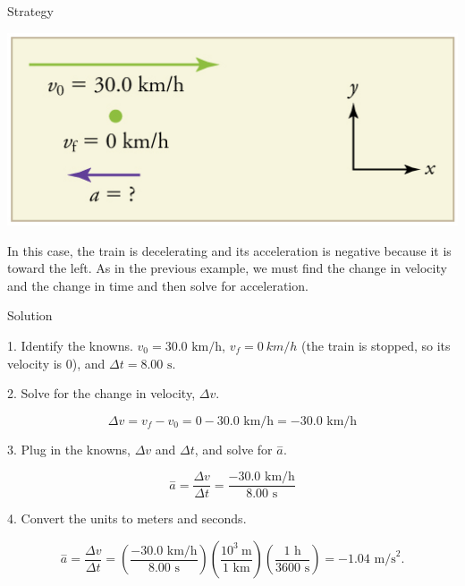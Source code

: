 \documentclass[
]{book}
\newenvironment{tinysection}{}{}
\begin{document}
\begin{tinysection}

{Strategy}

\end{tinysection}

\includegraphics{images/Figure_02_03_03d.jpg}

In this case, the train is decelerating and its acceleration is negative
because it is toward the left. As in the previous example, we must find
the change in velocity and the change in time and then solve for
acceleration.

\begin{tinysection}

{Solution}

\end{tinysection}

1. Identify the knowns. \({{v_{0} = \text{30}}\text{.0\ km/h}}{}\),
\({v_{f} = 0\ km/h}{}\) (the train is stopped, so its velocity is 0), and
\({\Delta t =}\text{8.00\ s}\).

2. Solve for the change in velocity, \({\Delta v}{}\).

\leavevmode\hypertarget{import-auto-id2586229}{}%
\[{{\Delta v = {v_{f} - v_{0}}} = 0 - \text{30}}\text{.}{\text{0\ km/h} = {- \text{30}}}\text{.0\ km/h}\]

3. Plug in the knowns, \({\Delta v}{}\) and \({\Delta t}{}\), and solve for
\(\overset{-}{a}{}\).

\leavevmode\hypertarget{import-auto-id2412874}{}%
\[{{\overset{-}{a} = \frac{\Delta v}{\Delta t}} = \frac{{- \text{30}}\text{.}\text{0\ km/h}}{8\text{.}\text{00\ s}}}{}\]

4. Convert the units to meters and seconds.

\leavevmode\hypertarget{import-auto-id2596926}{}%
\[{{{\overset{-}{a} = \frac{\Delta v}{\Delta t}} = \left( \frac{- \text{30.0\ km/h}}{\text{8.00\ s}} \right)}\left( \frac{\text{10}^{3}\ \text{m}}{\text{1\ km}} \right){\left( \frac{\text{1\ h}}{\text{3600\ s}} \right) = \text{−1.04\ m/s}^{2}}}\text{.}\]
\end{document}
